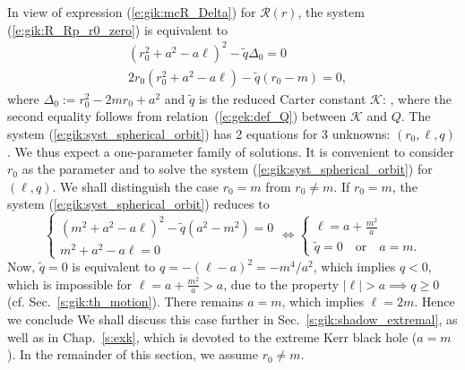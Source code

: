 In view of expression (\ref{e:gik:mcR_Delta}) for $\mathcal{R}(r)$, the system
(\ref{e:gik:R_Rp_r0_zero}) is equivalent to
\begin{subequations}
\label{e:gik:syst_spherical_orbit}
\begin{align}
    &(r_0^2 + a^2 - a \ell)^2 - \tilde{q} \Delta_0 = 0  \label{e:gik:syst_spherical_orbit_1} \\
    & 2 r_0 (r_0^2 + a^2 - a \ell) - \tilde{q} (r_0 - m) = 0 , \label{e:gik:syst_spherical_orbit_2}
\end{align}
\end{subequations}
where $\Delta_0 := r_0^2 - 2 m r_0 + a^2$ and $\tilde{q}$ is the reduced
Carter constant $\mathscr{K}$:
\be \label{e:gik:def_tq}
    ,
\ee
where the second equality follows from relation~(\ref{e:gek:def_Q})
between $\mathscr{K}$ and $Q$.
The system (\ref{e:gik:syst_spherical_orbit}) has 2 equations for 3 unknowns: $(r_0,\ell,q)$. We thus
expect a one-parameter family of solutions. It is convenient to consider
$r_0$ as the parameter and to solve the system (\ref{e:gik:syst_spherical_orbit})
for $(\ell,q)$.
We shall distinguish the case $r_0 = m$ from $r_0 \neq m$.
If $r_0 = m$, the system (\ref{e:gik:syst_spherical_orbit}) reduces to
\[
\left\{\begin{array}{l}
    (m^2 + a^2 - a \ell)^2 - \tilde{q} (a^2 - m^2) = 0 \\
    m^2 + a^2 - a \ell = 0
\end{array}
\right.
\iff
\left\{\begin{array}{l}
    \ell = a + \frac{m^2}{a}\\
    \tilde{q} = 0 \quad\mbox{or}\quad a = m .
\end{array}
\right.
\]
Now, $\tilde{q} = 0$ is equivalent to $q = - (\ell - a)^2 = - m^4 / a^2$,
which implies $q< 0$, which is impossible for $\ell = a + \frac{m^2}{a} > a$,
due to the property $|\ell| > a \implies q \geq 0$ (cf. Sec.~\ref{s:gik:th_motion}).
There remains $a = m$, which implies $\ell = 2 m$. Hence we conclude
\be \label{e:gik:spher_orb_r0_eq_m}
\ee
We shall discuss this case further in Sec.~\ref{s:gik:shadow_extremal}, as well as in
Chap.~\ref{s:exk}, which is devoted
to the extreme Kerr black hole ($a=m$).
In the remainder of this section, we assume $r_0 \neq m$.

